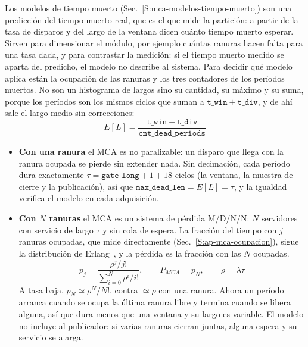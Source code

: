 Los modelos de tiempo muerto (Sec.~\ref{S:mca-modelos-tiempo-muerto}) son una
predicción del tiempo muerto real, que es el que mide la partición: a partir de
la tasa de disparos y del largo de la ventana dicen cuánto tiempo muerto
esperar. Sirven para dimensionar el módulo, por ejemplo cuántas ranuras hacen
falta para una tasa dada, y para contrastar la medición: si el tiempo muerto
medido se aparta del predicho, el modelo no describe al sistema. Para decidir
qué modelo aplica están la ocupación de las ranuras y los tres contadores de los
períodos muertos. No son un histograma de largos sino su cantidad, su máximo y
su suma, porque los períodos son los mismos ciclos que suman a
$\mathtt{t\_win} + \mathtt{t\_div}$, y de ahí sale el largo medio sin
correcciones:
\begin{equation}
  E[L] = \frac{\mathtt{t\_win} + \mathtt{t\_div}}{\mathtt{cnt\_dead\_periods}}
  \label{e:ap-mca-largo-medio}
\end{equation}
\begin{itemize}
  \item \textbf{Con una ranura} el MCA es no paralizable: un disparo que llega
    con la ranura ocupada se pierde sin extender nada. Sin decimación, cada
    período dura exactamente $\tau = \mathtt{gate\_long} + 1 + 18$ ciclos (la
    ventana, la muestra de cierre y la publicación), así que
    $\mathtt{max\_dead\_len} = E[L] = \tau$, y la igualdad verifica el modelo en
    cada adquisición.
  \item \textbf{Con $N$ ranuras} el MCA es un sistema de pérdida M/D/N/N: $N$
    servidores con servicio de largo $\tau$ y sin cola de espera. La fracción
    del tiempo con $j$ ranuras ocupadas, que mide directamente
     (Sec.~\ref{S:ap-mca-ocupacion}), sigue la distribución
    de Erlang~, y la pérdida es la fracción con las
    $N$ ocupadas.
    \begin{equation}
      p_j = \frac{\rho^j/j!}{\sum_{i=0}^{N}\rho^i/i!}, \qquad P_{MCA} = p_N,
      \qquad \rho = \lambda\tau
      \label{e:ap-mca-erlang}
    \end{equation}
    A tasa baja, $p_N \simeq \rho^N/N!$, contra $\simeq \rho$ con una ranura.
    Ahora un período arranca cuando se ocupa la última ranura libre y termina
    cuando se libera alguna, así que dura menos que una ventana y su largo es
    variable. El modelo no incluye al publicador: si varias ranuras cierran
    juntas, alguna espera y su servicio se alarga.
\end{itemize}

